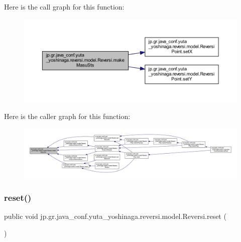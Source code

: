 Here is the call graph for this function\+:
\nopagebreak
\begin{figure}[H]
\begin{center}
\leavevmode
\includegraphics[width=350pt]{classjp_1_1gr_1_1java__conf_1_1yuta__yoshinaga_1_1reversi_1_1model_1_1_reversi_a9929ed36140ddc25923ede99f86564c3_cgraph}
\end{center}
\end{figure}
Here is the caller graph for this function\+:
\nopagebreak
\begin{figure}[H]
\begin{center}
\leavevmode
\includegraphics[width=350pt]{classjp_1_1gr_1_1java__conf_1_1yuta__yoshinaga_1_1reversi_1_1model_1_1_reversi_a9929ed36140ddc25923ede99f86564c3_icgraph}
\end{center}
\end{figure}
\mbox{\label{classjp_1_1gr_1_1java__conf_1_1yuta__yoshinaga_1_1reversi_1_1model_1_1_reversi_a497552844cbae36207f2d8c836a26b8e}} 
\subsubsection{\texorpdfstring{reset()}{reset()}}
{\footnotesize\ttfamily public void jp.\+gr.\+java\+\_\+conf.\+yuta\+\_\+yoshinaga.\+reversi.\+model.\+Reversi.\+reset (\begin{DoxyParamCaption}{ }\end{DoxyParamCaption})}



